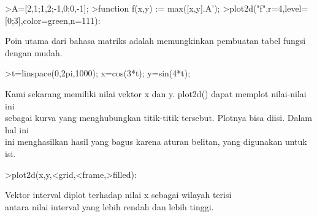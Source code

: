 \documentclass[a4paper,10pt]{article}
\begin{document}
\begin{eulernotebook}
\begin{eulercomment}
\begin{eulercomment}
\begin{eulercomment}
\begin{eulercomment}
\begin{eulercomment}
\begin{eulercomment}
\begin{eulerprompt}
>A=[2,1;1,2;-1,0;0,-1];
>function f(x,y) := max([x,y].A');
>plot2d("f",r=4,level=[0;3],color=green,n=111):
\end{eulerprompt}
\begin{eulercomment}
Poin utama dari bahasa matriks adalah memungkinkan pembuatan tabel
fungsi dengan mudah.
\end{eulercomment}
\begin{eulerprompt}
>t=linspace(0,2pi,1000); x=cos(3*t); y=sin(4*t);
\end{eulerprompt}
\begin{eulercomment}
Kami sekarang memiliki nilai vektor x dan y. plot2d() dapat memplot
nilai-nilai ini\\
sebagai kurva yang menghubungkan titik-titik tersebut. Plotnya bisa
diisi. Dalam hal ini\\
ini menghasilkan hasil yang bagus karena aturan belitan, yang
digunakan untuk\\
isi.
\end{eulercomment}
\begin{eulerprompt}
>plot2d(x,y,<grid,<frame,>filled):
\end{eulerprompt}
\begin{eulercomment}
Vektor interval diplot terhadap nilai x sebagai wilayah terisi\\
antara nilai interval yang lebih rendah dan lebih tinggi.


\end{eulercomment}
\end{eulercomment}
\end{eulercomment}
\end{eulercomment}
\end{eulercomment}
\end{eulercomment}
\end{eulercomment}
\end{eulernotebook}
\end{document}
